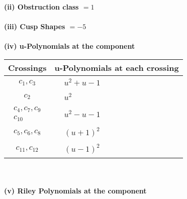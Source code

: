 \documentclass[1p]{elsarticle_modified}
\theoremstyle{definition}
\begin{document}
\flushleft \textbf{(ii) Obstruction class $= 1$}\\~\\
\flushleft \textbf{(iii) Cusp Shapes $= -5$}\\~\\
\newpage\renewcommand{\arraystretch}{1}
\flushleft \textbf{(iv) u-Polynomials at the component}\newline \\
\begin{tabular}{m{50pt}|m{274pt}}
Crossings & \hspace{64pt}u-Polynomials at each crossing \\
\hline $$\begin{aligned}c_{1},c_{3}\end{aligned}$$&$\begin{aligned}
&u^2+u-1
\end{aligned}$\\
\hline $$\begin{aligned}c_{2}\end{aligned}$$&$\begin{aligned}
&u^2
\end{aligned}$\\
\hline $$\begin{aligned}c_{4},c_{7},c_{9}\\c_{10}\end{aligned}$$&$\begin{aligned}
&u^2- u-1
\end{aligned}$\\
\hline $$\begin{aligned}c_{5},c_{6},c_{8}\end{aligned}$$&$\begin{aligned}
&(u+1)^2
\end{aligned}$\\
\hline $$\begin{aligned}c_{11},c_{12}\end{aligned}$$&$\begin{aligned}
&(u-1)^2
\end{aligned}$\\
\hline
\end{tabular}\\~\\
\newpage\renewcommand{\arraystretch}{1}
\flushleft \textbf{(v) Riley Polynomials at the component}\newline \\
\end{document}
